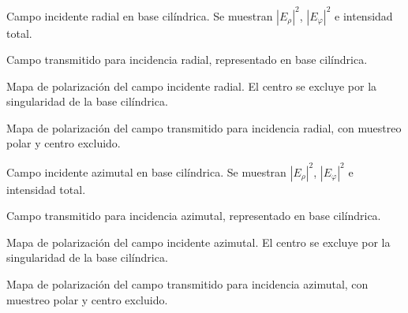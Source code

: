 \caption{Campo incidente radial en base cilíndrica. Se muestran $|E_\rho|^2$, $|E_\varphi|^2$ e intensidad total.}
\label{fig:radial-incidente-componentes}

\caption{Campo transmitido para incidencia radial, representado en base cilíndrica.}
\label{fig:radial-salida-componentes}

\caption{Mapa de polarización del campo incidente radial. El centro se excluye por la singularidad de la base cilíndrica.}
\label{fig:radial-incidente-mapa-polarizacion}

\caption{Mapa de polarización del campo transmitido para incidencia radial, con muestreo polar y centro excluido.}
\label{fig:radial-salida-mapa-polarizacion}

\caption{Campo incidente azimutal en base cilíndrica. Se muestran $|E_\rho|^2$, $|E_\varphi|^2$ e intensidad total.}
\label{fig:azimutal-incidente-componentes}

\caption{Campo transmitido para incidencia azimutal, representado en base cilíndrica.}
\label{fig:azimutal-salida-componentes}

\caption{Mapa de polarización del campo incidente azimutal. El centro se excluye por la singularidad de la base cilíndrica.}
\label{fig:azimutal-incidente-mapa-polarizacion}

\caption{Mapa de polarización del campo transmitido para incidencia azimutal, con muestreo polar y centro excluido.}
\label{fig:azimutal-salida-mapa-polarizacion}
